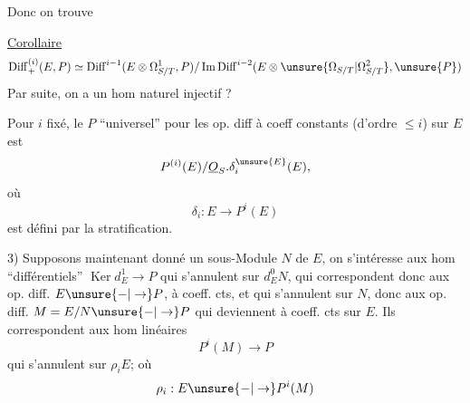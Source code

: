 Donc on trouve

\uline{Corollaire}
\[
\operatorname{Diff}^{(i)}_+(E,P)\simeq
\operatorname{Diff}^{i-1}(E\otimes\Omega^1_{S/T},P)/\operatorname{Im}\operatorname{Diff}^{i-2}(E\otimes\unsure{\Omega_{S/T}|\Omega^2_{S/T}},\unsure{P})
\]
Par suite, on a un hom naturel injectif \textcircled{?}

Pour $i$ fixé, le $P$ ``universel'' pour les op. diff à coeff constants (d'ordre $\leq i$) sur $E$ est
\[
P^{(i)}(E)/\underline{O}_S.\delta_i^{\unsure{E}}(E),
\]
où
\[
\delta_i:E\longrightarrow P^i(E)
\]
est défini par la stratification.

3) Supposons maintenant donné un sous-Module $N$ de $E$, on s'intéresse aux hom ``différentiels'' $\operatorname{Ker}d_E^1\to P$ qui s'annulent sur $d_E^0N$, qui correspondent donc aux op. diff. $E\unsure{\mathbin{-}|\to}P$, à coeff. cts, et qui s'annulent sur $N$, donc aux op. diff. $M=E/N\unsure{\mathbin{-}|\to}P$ qui  deviennent à coeff. cts sur $E$. Ils correspondent  aux hom linéaires
\[
P^i(M)\longrightarrow P
\]
qui s'annulent sur $\rho_iE$; où
\[
\rho_i:E\unsure{\mathbin{-}|\to}P^i(M)
\]
